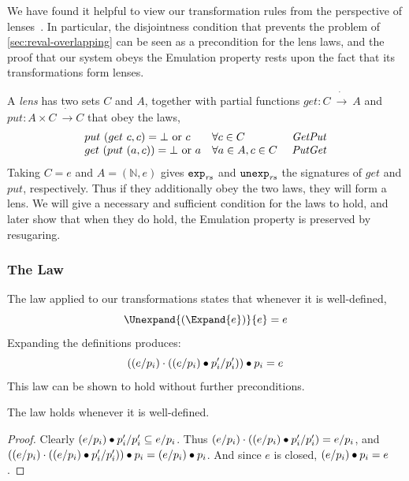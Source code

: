 We have found it helpful to view our transformation rules from the
perspective of lenses~\cite{fgkps:comb-bidir-tree-trans}. In
particular, the disjointness condition that prevents the 
problem of \cref{sec:reval-overlapping} can be seen as a precondition for the
lens laws, and the proof that our system obeys the Emulation property
rests upon the fact that its transformations form lenses.

A \emph{lens} has two sets $C$ and $A$, together with partial
functions $get : C\ \dot{\to}\ A$ and $put : A \times
C\ \dot{\to} C$ that obey the laws,
\[\begin{array}{lllll}
put\ (get\ c, c) = \bot \text{ or } c
  & \forall c \in C
  & \text{ \emph{GetPut}} \\
get\ (put\ (a, c)) = \bot \text{ or } a
  & \forall a \in A, c \in C
  & \text{ \emph{PutGet}}
\end{array}\]
Taking $C = e$ and $A = (\mathbb{N}, e)$ gives $\texttt{exp}_{\mathit{rs}}$ and
$\texttt{unexp}_{\mathit{rs}}$ the signatures of $get$ and $put$,
respectively. Thus if they additionally obey the two laws, they will
form a lens. We will give a necessary and sufficient condition for the
laws to hold, and later show that when they do hold, the Emulation
property is preserved by resugaring.

\subsubsection{The {\Getput} Law}
\label{sec:reval-getput}
The {\Getput} law applied to our transformations states that whenever it
is well-defined,
\[ \Unexpand{(\Expand{e})}{e} = e \]
Expanding the definitions produces:
\[ ((e / p_i) \cdot ((e / p_i) \bullet p_i' / p_i')) \bullet p_i = e \]
This law can be shown to hold without further preconditions.
\begin{lemma} The {\Getput} law holds whenever it is well-defined.
\end{lemma}
\begin{proof}
Clearly $(e / p_i) \bullet p_i' / p_i' \subseteq e / p_i$.
Thus $(e / p_i) \cdot ((e / p_i) \bullet p_i' / p_i')
 = e / p_i$,
and $((e / p_i) \cdot ((e / p_i) \bullet p_i' / p_i')) \bullet p_i
 = (e / p_i) \bullet p_i$.
And since $e$ is closed, $(e / p_i) \bullet p_i = e$.
\end{proof}

